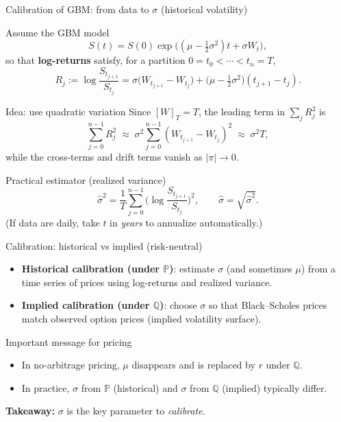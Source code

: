 \documentclass[10pt,aspectratio=169]{beamer}
\begin{document}
\begin{frame}{Calibration of GBM: from data to \texorpdfstring{$\sigma$}{sigma} (historical volatility)}

Assume the GBM model
\[
S(t)=S(0)\exp\!\Big((\mu-\tfrac12\sigma^2)t+\sigma W_t\Big),
\]
so that \textbf{log-returns} satisfy, for a partition \(0=t_0<\cdots<t_n=T\),\pause
\[
R_j
:=\log\!\frac{S_{t_{j+1}}}{S_{t_j}}
=
\sigma\big(W_{t_{j+1}}-W_{t_j}\big)
+
\Big(\mu-\tfrac12\sigma^2\Big)(t_{j+1}-t_j).
\]

\medskip
\begin{block}{Idea: use quadratic variation}
Since \([W]_T=T\), the leading term in \(\sum_j R_j^2\) is
\[
\sum_{j=0}^{n-1} R_j^2
\;\approx\;
\sigma^2\sum_{j=0}^{n-1}(W_{t_{j+1}}-W_{t_j})^2
\;\approx\;
\sigma^2 T,
\]
while the cross-terms and drift terms vanish as \(|\pi|\to 0\).\pause
\end{block}

\begin{alertblock}{Practical estimator (realized variance)}
\[
\widehat{\sigma}^2
=
\frac{1}{T}\sum_{j=0}^{n-1}
\Big(\log\!\frac{S_{t_{j+1}}}{S_{t_j}}\Big)^2,
\qquad
\widehat{\sigma}=\sqrt{\widehat{\sigma}^2}.
\]
(If data are daily, take \(t\) in \emph{years} to annualize automatically.)
\end{alertblock}

\end{frame}

\begin{frame}{Calibration: historical vs implied (risk-neutral)}

\begin{itemize}
  \item \textbf{Historical calibration (under \( \mathbb{P}\))}: estimate \(\sigma\) (and sometimes \(\mu\)) from a time series of prices using log-returns and realized variance.\pause
  \item \textbf{Implied calibration (under \( \mathbb{Q}\))}: choose \(\sigma\) so that Black--Scholes prices match observed option prices (implied volatility surface).\pause
\end{itemize}

\medskip
\begin{block}{Important message for pricing}
\begin{itemize}
  \item In no-arbitrage pricing, \(\mu\) disappears and is replaced by \(r\) under \(\mathbb{Q}\).\pause
  \item In practice, \(\sigma\) from \(\mathbb{P}\) (historical) and \(\sigma\) from \(\mathbb{Q}\) (implied) typically differ.\pause
\end{itemize}
\end{block}

\medskip
\textbf{Takeaway:}\pause\;
\(\sigma\) is the key parameter to \emph{calibrate}.

\end{frame}
\end{document}
